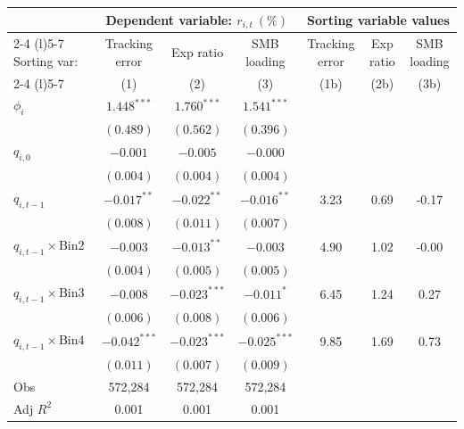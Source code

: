 \begin{tabular}{lcccccc}
  \toprule & \multicolumn{3}{c}{Dependent variable: $r_{i,t}~(\%)$ } & \multicolumn{3}{c}{Sorting variable values} \\
 \cmidrule(l){2-4} \cmidrule(l){5-7}
    Sorting var: & Tracking error & Exp ratio & SMB loading & Tracking error & Exp ratio & SMB loading \\
 \cmidrule(l){2-4} \cmidrule(l){5-7}  \vspace{5pt} & (1) & (2) & (3) & (1b) & (2b) & (3b) \\ 
  $\phi_i$ & $1.448^{***}$ & $1.760^{***}$ & $1.541^{***}$ &  &  &  \\ 
   & $(0.489)$ & $(0.562)$ & $(0.396)$ &  &  &  \\ 
  $q_{i,0}$ & $-0.001$ & $-0.005$ & $-0.000$ &  &  &  \\ 
   & $(0.004)$ & $(0.004)$ & $(0.004)$ &  &  &  \\ 
  $q_{i,t-1}$ & $-0.017^{**}$ & $-0.022^{**}$ & $-0.016^{**}$ & 3.23 & 0.69 & -0.17 \\ 
   & $(0.008)$ & $(0.011)$ & $(0.007)$ &  &  &  \\ 
  $q_{i,t-1} \times \text{Bin2}$ & $-0.003$ & $-0.013^{**}$ & $-0.003$ & 4.90 & 1.02 & -0.00 \\ 
   & $(0.004)$ & $(0.005)$ & $(0.005)$ &  &  &  \\ 
  $q_{i,t-1} \times \text{Bin3}$ & $-0.008$ & $-0.023^{***}$ & $-0.011^{*}$ & 6.45 & 1.24 & 0.27 \\ 
   & $(0.006)$ & $(0.008)$ & $(0.006)$ &  &  &  \\ 
  $q_{i,t-1} \times \text{Bin4}$ & $-0.042^{***}$ & $-0.023^{***}$ & $-0.025^{***}$ & 9.85 & 1.69 & 0.73 \\ 
   \vspace{5pt} & $(0.011)$ & $(0.007)$ & $(0.009)$ &  &  &  \\ 
  Obs & 572,284 & 572,284 & 572,284 &  &  &  \\ 
  Adj $R^2$ & 0.001 & 0.001 & 0.001 &  &  &  \\ 
   \bottomrule 
\end{tabular}
